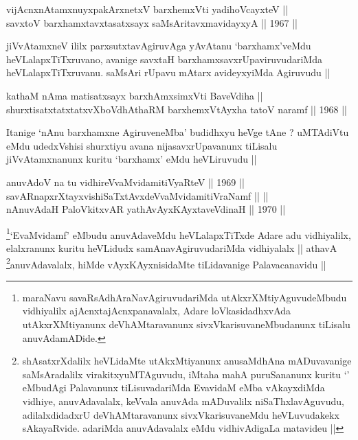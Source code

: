 
\begin{shl}
vijAcnxnAtamxnuyxpakArxnetxV barxhemxVti yadihoVcayxteV || \\
savxtoV barxhamxtavxtasatxsayx saMsAritavxmavidayxyA ||  1967 ||  
\end{shl}

\begin{artha}
jiVvAtamxneV ililx parxsutxtavAgiruvAga yAvAtanu `barxhamx'veMdu
heVLalapxTiTxruvano, avanige savxtaH barxhamxsavxrUpaviruvudariMda
heVLalapxTiTxruvanu. saMsAri rUpavu mAtarx avideyxyiMda Agiruvudu ||
\end{artha}


\begin{shl}
kathaM nAma matisatxsayx barxhAmxsimxVti BaveVdiha || \\
shurxtisatxtatxtatxvXboVdhAthaRM barxhemxVtAyxha tatoV naramf ||  1968 ||  
\end{shl}

\begin{artha}
Itanige `nAnu barxhamxne AgiruveneMba' budidhxyu heVge tAne ?
uMTAdiVtu eMdu udedxVshisi shurxtiyu avana nijasavxrUpavanunx tiLisalu
jiVvAtamxnanunx kuritu `barxhamx' eMdu heVLiruvudu ||
\end{artha}


\begin{shl}
anuvAdoV na tu vidhireVvaMvidamitiVyaRteV ||  1969 || \\
savARnapxrXtayxvishiSaTxtAvxdeVvaMvidamitiVraNamf ||  || \\
nAnuvAdaH PaloVkitxvAR yathAvAyxKAyxtaveVdinaH ||  1970 ||  
\end{shl}

\begin{artha}
\footnote[1]{maraNavu savaRsAdhAraNavAgiruvudariMda
utAkxrXMtiyAguvudeMbudu vidhiyalilx ajAcnxtajAcnxpanavalalx, Adare
loVkasidadhxvAda utAkxrXMtiyanunx deVhAMtaravanunx
sivxVkarisuvaneMbudanunx tiLisalu anuvAdamADide.}`EvaMvidamf' eMbudu anuvAdaveMdu heVLalapxTiTxde Adare
adu vidhiyalilx, elalxranunx kuritu heVLidudx samAnavAgiruvudariMda
vidhiyalalx || athavA \footnote[2]{shAsatxrXdalilx heVLidaMte
utAkxMtiyanunx anusaMdhAna mADuvavanige saMsAradalilx
virakitxyuMTAguvudu, iMtaha mahA puruSananunx kuritu `\stext'
eMbudAgi Palavanunx tiLisuvadariMda EvavidaM eMba vAkayxdiMda
vidhiye, anuvAdavalalx, keVvala anuvAda mADuvalilx
niSaThxlavAguvudu, adilalxdidadxrU deVhAMtaravanunx
sivxVkarisuvaneMdu heVLuvudakekx sAkayaRvide. adariMda anuvAdavalalx
eMdu vidhivAdigaLa matavideu ||}anuvAdavalalx, hiMde
vAyxKAyxnisidaMte tiLidavanige Palavacanavidu ||
\end{artha}

